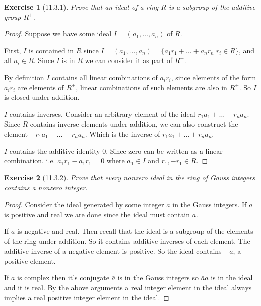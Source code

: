 \documentclass[12pt]{article}
\newtheorem*{exer}{Exercise}
\begin{document}
\begin{exer}[11.3.1]

    Prove that an ideal of a ring $R$ is a subgroup of the additive
    group $R^+$.

\end{exer}

\begin{proof}

    Suppose we have some ideal $I = (a_1, \dots, a_n)$ of $R$. 

    First, $I$ is contained in $R$ since $I = (a_1, \dots, a_n) = \{a_1
    r_1 + \dots + a_n r_n | r_i \in R\}$, and all $a_i \in R$. Since $I$
    is in $R$ we can consider it as part of $R^+$.

    By definition $I$ contains all linear combinations of $a_i r_i$,
    since elements of the form $a_i r_i$ are elements of $R^+$, linear
    combinations of such elements are also in $R^+$. So $I$ is closed
    under addition.

    $I$ contains inverses. Consider an arbitrary element of the ideal
    $r_1 a_1 + \dots + r_n a_n$. Since $R$ contains inverse elements
    under addition, we can also construct the element $-r_1 a_1 - \dots
    - r_n a_n$. Which is the inverse of $r_1 a_1 + \dots + r_n a_n$.
    
    $I$ contains the additive identity $0$. Since zero can be written
    as a linear combination. i.e. $a_1 r_1 - a_1 r_1 = 0$ where $a_1 \in
    I$ and $r_1, -r_1 \in R$.

\end{proof}


\begin{exer}[11.3.2]

    Prove that every nonzero ideal in the ring of Gauss integers
    contains a nonzero integer.

\end{exer}

\begin{proof}

    Consider the ideal generated by some integer $a$ in the Gauss
    integers. If $a$ is positive and real we are done since the ideal
    must contain $a$.

    If $a$ is negative and real. Then recall that the ideal is a
    subgroup of the elements of the ring under addition. So it contains
    additive inverses of each element. The additive inverse of a
    negative element is positive. So the ideal contains $-a$, a positive
    element.

    If $a$ is complex then it's conjugate $\bar{a}$ is in the Gauss
    integers so $\bar{a}a$ is in the ideal and it is real. By the above
    arguments a real integer element in the ideal always implies a real
    positive integer element in the ideal.
    
\end{proof}
\end{document}
